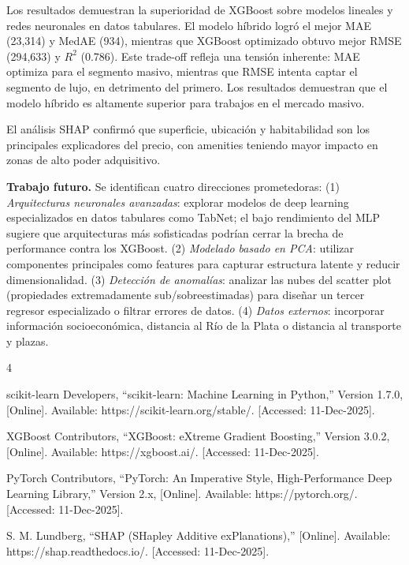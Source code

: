 \documentclass[conference]{IEEEtran}
\begin{document}
Los resultados demuestran la superioridad de XGBoost sobre modelos lineales y redes neuronales en datos tabulares. El modelo híbrido logró el mejor MAE (23,314) y MedAE (934), mientras que XGBoost optimizado obtuvo mejor RMSE (294,633) y $R^2$ (0.786). Este trade-off refleja una tensión inherente: MAE optimiza para el segmento masivo, mientras que RMSE intenta captar el segmento de lujo, en detrimento del primero. Los resultados demuestran que el modelo híbrido es altamente superior para trabajos en el mercado masivo. 

El análisis SHAP confirmó que superficie, ubicación y habitabilidad son los principales explicadores del precio, con amenities teniendo mayor impacto en zonas de alto poder adquisitivo.

\textbf{Trabajo futuro.} Se identifican cuatro direcciones prometedoras: (1) \textit{Arquitecturas neuronales avanzadas}: explorar modelos de deep learning especializados en datos tabulares como TabNet; el bajo rendimiento del MLP sugiere que arquitecturas más sofisticadas podrían cerrar la brecha de performance contra los XGBoost. (2) \textit{Modelado basado en PCA}: utilizar componentes principales como features para capturar estructura latente y reducir dimensionalidad. (3) \textit{Detección de anomalías}: analizar las nubes del scatter plot (propiedades extremadamente sub/sobreestimadas) para diseñar un tercer regresor especializado o filtrar errores de datos. (4) \textit{Datos externos}: incorporar información socioeconómica, distancia al Río de la Plata o distancia al transporte y plazas.

    \begin{thebibliography}{4}
    
    scikit-learn Developers, ``scikit-learn: Machine Learning in Python,'' Version 1.7.0, [Online]. Available: https://scikit-learn.org/stable/. [Accessed: 11-Dec-2025].
    
    XGBoost Contributors, ``XGBoost: eXtreme Gradient Boosting,'' Version 3.0.2, [Online]. Available: https://xgboost.ai/. [Accessed: 11-Dec-2025].
    
    PyTorch Contributors, ``PyTorch: An Imperative Style, High-Performance Deep Learning Library,'' Version 2.x, [Online]. Available: https://pytorch.org/. [Accessed: 11-Dec-2025].
    
    S. M. Lundberg, ``SHAP (SHapley Additive exPlanations),'' [Online]. Available: https://shap.readthedocs.io/. [Accessed: 11-Dec-2025].
    
    \end{thebibliography}
\end{document}

